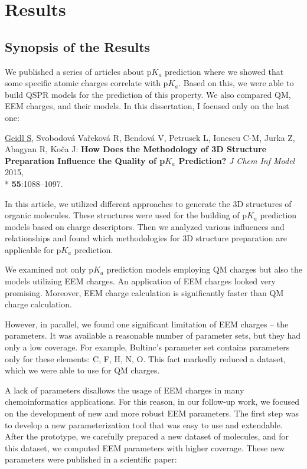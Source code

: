 \part{Results}
\label{part:results}

\chapter{Synopsis of the Results}

We published a series of articles about p$K_a$ prediction \cite{Svobodova2011, Svobodova2013} where we showed that
some specific atomic charges correlate with p$K_a$. Based on this, we were able
to build QSPR models for the prediction of this property. We also compared QM,
EEM charges, and their models.  In this dissertation, I focused only
on the last one:

\vspace{5mm}
\underline{Geidl S}, Svobodová Vařeková R, Bendová V, Petrusek L, Ionescu C-M,
Jurka Z, Abagyan R, Koča J: \textbf{How Does the Methodology of 3D Structure
Preparation Influence the Quality of p$K_a$ Prediction?} \textit{J Chem Inf Model}
2015, \\* \textbf{55}:1088–1097.
\vspace{5mm}

In this article, we utilized different approaches to generate the 3D structures
of organic molecules. These structures were used for the building of p$K_a$
prediction models based on charge descriptors. Then we analyzed various
influences and relationships and found which methodologies for 3D structure
preparation are applicable for p$K_a$ prediction. 

We examined not only p$K_a$ prediction models employing QM charges but also the
models utilizing EEM charges. An application of EEM charges looked very
promising. Moreover, EEM charge calculation is significantly faster than
QM charge calculation. 

However, in parallel, we found one significant limitation of EEM charges -- the
parameters. It was available a reasonable number of parameter sets, but they
had only a low coverage.  For example, Bultinc's parameter
set \cite{Bultinck2002} contains parameters only for these elements: C, F, H, N,
O. This fact markedly reduced a dataset, which we were able to use for QM
charges. 

A lack of parameters disallows the usage of EEM charges in many chemoinformatics
applications. For this reason, in our follow-up work, we focused
on the development of new and more robust EEM parameters. The first step was to
develop a new parameterization tool that was easy to use and extendable.
After the prototype, we carefully prepared a new dataset of molecules, and
for this dataset, we computed EEM parameters with higher coverage. These new
parameters were published in a scientific paper:


